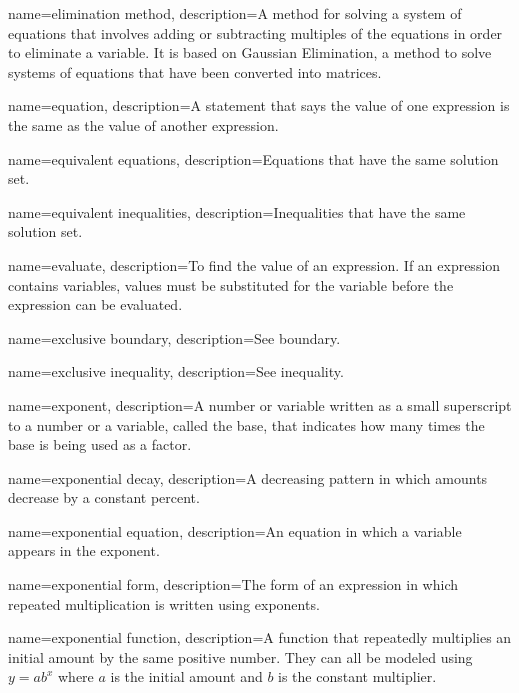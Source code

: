  {
	name=elimination method,
	description={A method for solving a system of equations that involves adding or subtracting multiples of the equations in order to eliminate a variable. It is based on Gaussian Elimination, a method to solve systems of equations that have been converted into matrices.}
}

 {
	name=equation,
	description={A statement that says the value of one expression is the same as the value of another expression.}
}

 {
	name=equivalent equations,
	description={Equations that have the same solution set.}
}

 {
	name=equivalent inequalities,
	description={Inequalities that have the same solution set.}
}

 {
	name=evaluate,
	description={To find the value of an expression. If an expression contains variables, values must be substituted for the variable before the expression can be evaluated.}
}

 {
	name=exclusive boundary,
	description={See \gls{boundary}.}
}

 {
	name=exclusive inequality,
	description={See \gls{inequality}.}
}

 {
	name=exponent,
	description={A number or variable written as a small superscript to a number or a variable, called the \gls{base}, that indicates how many times the base is being used as a factor.}
}

 {
	name=exponential decay,
	description={A decreasing pattern in which amounts decrease by a constant percent.}
}

 {
	name=exponential equation,
	description={An equation in which a variable appears in the exponent.}
}

 {
	name=exponential form,
	description={The form of an expression in which repeated multiplication is written using exponents.}
}

 {
	name=exponential function,
	description={A function that repeatedly multiplies an initial amount by the same positive number. They can all be modeled using $y = ab^x$ where $a$ is the initial amount and $b$ is the constant multiplier.}
}

